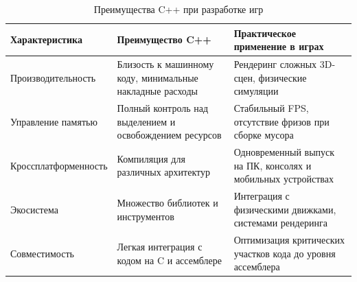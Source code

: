 \begin{table}[H]
\centering
\caption{Преимущества C++ при разработке игр}
\label{tab:cppDev}

\begin{tabular}{|p{}|p{}|p{}|}
\hline
\textbf{Характеристика} & \textbf{Преимущество C++} & \textbf{Практическое применение в играх} \\
\hline
Производительность & Близость к машинному коду, минимальные накладные расходы & Рендеринг сложных 3D-сцен, физические симуляции \\
\hline
Управление памятью & Полный контроль над выделением и освобождением ресурсов & Стабильный FPS, отсутствие фризов при сборке мусора \\
\hline
Кроссплатформенность & Компиляция для различных архитектур & Одновременный выпуск на ПК, консолях и мобильных устройствах \\
\hline
Экосистема & Множество библиотек и инструментов & Интеграция с физическими движками, системами рендеринга \\
\hline
Совместимость & Легкая интеграция с кодом на C и ассемблере & Оптимизация критических участков кода до уровня ассемблера \\
\hline
\end{tabular}
\end{table}